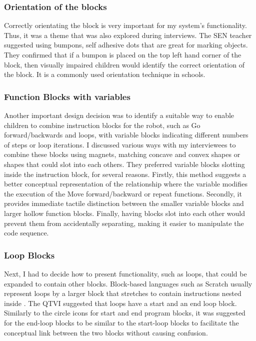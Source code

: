 \documentclass[oneside,%
                    author={Malak Hajji},
                    degree={BSc},
                    title={Designing An Accessible Computational Toolkit For Students},
                  subtitle={With Mixed Visual Abilities}]{dissertation}
\begin{document}
\subsubsection{Orientation of the blocks}
Correctly orientating the block is very important for my system's functionality. Thus, it was a theme that was also explored during interviews. The SEN teacher suggested using bumpons, self adhesive dots that are great for marking objects. They confirmed that if a bumpon is placed on the top left hand corner of the block, then visually impaired children would identify the correct orientation of the block. It is a commonly used orientation technique in schools.
\subsubsection{Function Blocks with variables}
Another important design decision was to identify a suitable way to enable children to combine instruction blocks for the robot, such as Go forward/backwards and loops, with variable blocks indicating different numbers of steps or loop iterations. I discussed various ways with my interviewees to combine these blocks using magnets, matching concave and convex shapes or shapes that could slot into each others. They preferred variable blocks slotting inside the instruction block, for several reasons. Firstly, this method suggests a better conceptual representation of the relationship where the variable modifies the execution of the Move forward/backward or repeat functions. Secondly, it provides immediate tactile distinction between the smaller variable blocks and larger hollow function blocks. Finally, having blocks slot into each other would prevent them from accidentally separating, making it easier to manipulate the code sequence.
\subsubsection{Loop Blocks}
Next, I had to decide how to present functionality, such as loops, that could be expanded to contain other blocks.  Block-based languages such as Scratch usually represent loops by a larger block that stretches to contain instructions nested inside \cite{scratch}.
The QTVI suggested that loops have a start and an end loop block. Similarly to the circle icons for start and end program blocks, it was suggested for the end-loop blocks to be similar to the start-loop blocks to facilitate the conceptual link between the two blocks without causing confusion.
\end{document}

